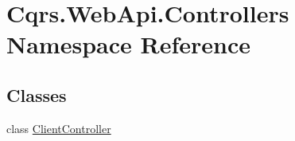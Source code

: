 \hypertarget{namespaceCqrs_1_1WebApi_1_1Controllers}{}\section{Cqrs.\+Web\+Api.\+Controllers Namespace Reference}
\label{namespaceCqrs_1_1WebApi_1_1Controllers}
\subsection*{Classes}
\begin{DoxyCompactItemize}
\item 
class \hyperlink{classCqrs_1_1WebApi_1_1Controllers_1_1ClientController}{Client\+Controller}
\end{DoxyCompactItemize}

